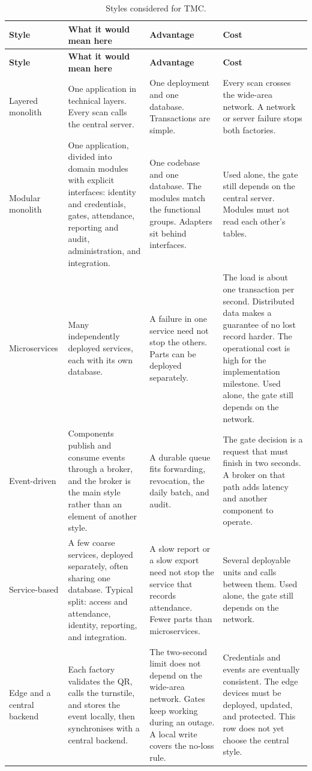 \begin{longtable}{@{}L{2.35cm}L{4.15cm}L{4.05cm}L{4.15cm}@{}}
\caption{Styles considered for TMC.}
\label{tab:styles}\\
\toprule
\textbf{Style} & \textbf{What it would mean here} & \textbf{Advantage} & \textbf{Cost}\\
\midrule
\endfirsthead
\toprule
\textbf{Style} & \textbf{What it would mean here} & \textbf{Advantage} & \textbf{Cost}\\
\midrule
\endhead
Layered monolith &
One application in technical layers.
Every scan calls the central server. &
One deployment and one database.
Transactions are simple. &
Every scan crosses the wide-area network.
A network or server failure stops both factories.\\
\addlinespace
Modular monolith &
One application, divided into domain modules with explicit interfaces: identity and credentials, gates, attendance, reporting and audit, administration, and integration. &
One codebase and one database.
The modules match the functional groups.
Adapters sit behind interfaces. &
Used alone, the gate still depends on the central server.
Modules must not read each other's tables.\\
\addlinespace
Microservices &
Many independently deployed services, each with its own database. &
A failure in one service need not stop the others.
Parts can be deployed separately. &
The load is about one transaction per second.
Distributed data makes a guarantee of no lost record harder.
The operational cost is high for the implementation milestone.
Used alone, the gate still depends on the network.\\
\addlinespace
Event-driven &
Components publish and consume events through a broker, and the broker is the main style rather than an element of another style. &
A durable queue fits forwarding, revocation, the daily batch, and audit. &
The gate decision is a request that must finish in two seconds.
A broker on that path adds latency and another component to operate.\\
\addlinespace
Service-based &
A few coarse services, deployed separately, often sharing one database.
Typical split: access and attendance, identity, reporting, and integration. &
A slow report or a slow export need not stop the service that records attendance.
Fewer parts than microservices. &
Several deployable units and calls between them.
Used alone, the gate still depends on the network.\\
\addlinespace
Edge and a central backend &
Each factory validates the QR, calls the turnstile, and stores the event locally, then synchronises with a central backend. &
The two-second limit does not depend on the wide-area network.
Gates keep working during an outage.
A local write covers the no-loss rule. &
Credentials and events are eventually consistent.
The edge devices must be deployed, updated, and protected.
This row does not yet choose the central style.\\
\bottomrule
\end{longtable}


